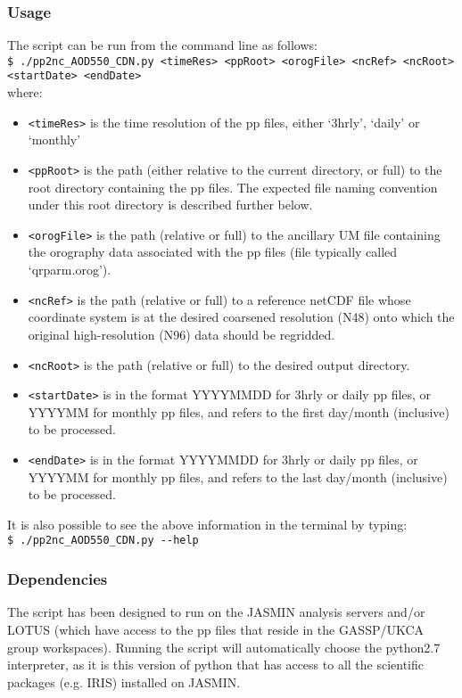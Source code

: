 \documentclass[10pt,a4paper]{article}
\newcommand\tab[1][0.5cm]{\hspace*{#1}}
\begin{document}
\subsubsection{Usage}
The script can be run from the command line as follows:\\
\tab \texttt{\$ ./pp2nc\_AOD550\_CDN.py <timeRes> <ppRoot> <orogFile> <ncRef> <ncRoot> <startDate> <endDate>}\\
where:
\begin{itemize}
\item \texttt{<timeRes>} is the time resolution of the pp files, either `3hrly', `daily' or `monthly'
\item \texttt{<ppRoot>} is the path (either relative to the current directory, or full) to the root directory containing the pp files. The expected file naming convention under this root directory is described further below.
\item \texttt{<orogFile>} is the path (relative or full) to the ancillary UM file containing the orography data associated with the pp files (file typically called `qrparm.orog').
\item \texttt{<ncRef>} is the path (relative or full) to a reference netCDF file whose coordinate system is at the desired coarsened resolution (N48) onto which the original high-resolution (N96) data should be regridded.
\item \texttt{<ncRoot>} is the path (relative or full) to the desired output directory.
\item \texttt{<startDate>} is in the format YYYYMMDD for 3hrly or daily pp files, or YYYYMM for monthly pp files, and refers to the first day/month (inclusive) to be processed.
\item \texttt{<endDate>} is in the format YYYYMMDD for 3hrly or daily pp files, or YYYYMM for monthly pp files, and refers to the last day/month (inclusive) to be processed.
\end{itemize}
It is also possible to see the above information in the terminal by typing:\\
\tab \texttt{\$ ./pp2nc\_AOD550\_CDN.py -{}-help}

\subsubsection{Dependencies}
The script has been designed to run on the JASMIN analysis servers and/or LOTUS (which have access to the pp files that reside in the GASSP/UKCA group workspaces). Running the script will automatically choose the python2.7 interpreter, as it is this version of python that has access to all the scientific packages (e.g. IRIS) installed on JASMIN.\\
\end{document}
